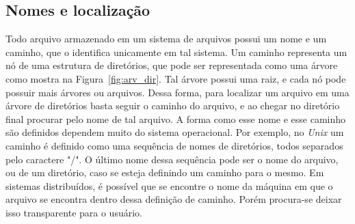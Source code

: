 	
	
	
	
	
		
	\subsection{Nomes e localização}
	Todo arquivo armazenado em um sistema de arquivos possui um nome e um caminho, que o identifica unicamente em tal sistema.
	Um caminho representa um nó de uma estrutura de diretórios, que pode ser representada como uma árvore como mostra na Figura~\ref{fig:arv_dir}.
	Tal árvore possui uma raiz, e cada nó pode possuir mais árvores ou arquivos.
	Dessa forma, para localizar um arquivo em uma árvore de diretórios basta seguir o caminho do arquivo, e ao chegar no diretório final procurar pelo nome de tal arquivo.
	A forma como esse nome e esse caminho são definidos dependem muito do sistema operacional. 
	Por exemplo, no \textit{Unix} um caminho é definido como uma sequência de nomes de diretórios, todos separados pelo caractere "/". O último nome dessa sequência pode ser o nome do arquivo, ou de um diretório, caso se esteja definindo um caminho para o mesmo.
	Em sistemas distribuídos, é possível que se encontre o nome da máquina em que o arquivo se encontra dentro dessa definição de caminho. Porém procura-se deixar isso transparente para o usuário.
	
